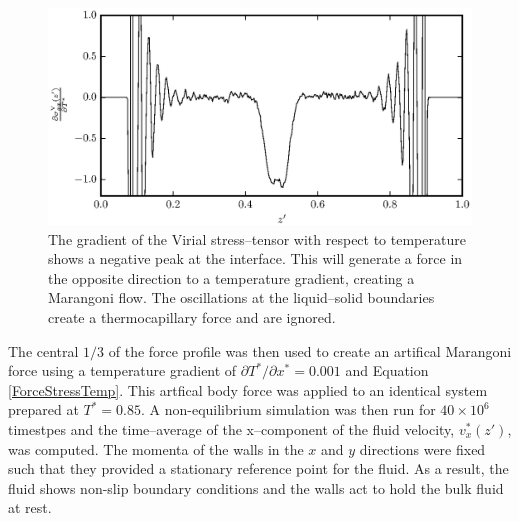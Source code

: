 \begin{figure}[h]
\centering
\includegraphics[scale=0.8]{PisVirForce}
\caption{The gradient of the Virial stress--tensor with respect to temperature shows a negative peak at the interface.
This will generate a force in the opposite direction to a temperature gradient, creating a Marangoni flow.
The oscillations at the liquid--solid boundaries create a thermocapillary force and are ignored.}
\label{PisVirForce}
\end{figure}
\FloatBarrier

The central $1/3$ of the force profile was then used to create an artifical Marangoni force using a temperature gradient of $\partial T^{*} / \partial x^{*} = 0.001$ and Equation \ref{ForceStressTemp}.
This artfical body force was applied to an identical system prepared at $T^{*} = 0.85$.
A non-equilibrium simulation was then run for $40 \times 10^{6}$ timestpes and the time--average of the x--component of the fluid velocity, $v^{*}_{x}(z')$, was computed.
The momenta of the walls in the $x$ and $y$ directions were fixed such that they provided a stationary reference point for the fluid.
As a result, the fluid shows non-slip boundary conditions and the walls act to hold the bulk fluid at rest.

